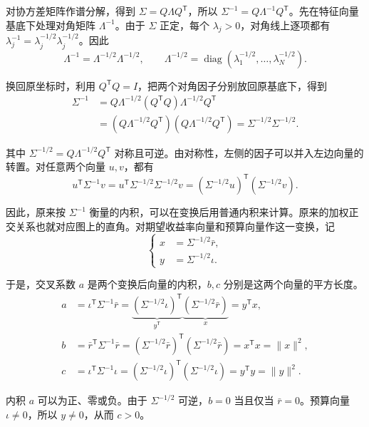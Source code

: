 \begin{solution}[label-content={证明},blank-type=none]
对协方差矩阵作谱分解，得到 $\Sigma=Q\Lambda Q^{\mathsf T}$，所以 $\Sigma^{-1}=Q\Lambda^{-1}Q^{\mathsf T}$。先在特征向量基底下处理对角矩阵 $\Lambda^{-1}$。由于 $\Sigma$ 正定，每个 $\lambda_j>0$，对角线上逐项都有 $\lambda_j^{-1}=\lambda_j^{-1/2}\lambda_j^{-1/2}$。因此
\[
 \Lambda^{-1}=\Lambda^{-1/2}\Lambda^{-1/2},
 \qquad \Lambda^{-1/2}=\operatorname{diag}(\lambda_1^{-1/2},\ldots,\lambda_N^{-1/2}).
\]

换回原坐标时，利用 $Q^{\mathsf T}Q=I$，把两个对角因子分别放回原基底下，得到
\[
 \begin{aligned}
 \Sigma^{-1}
 &=Q\Lambda^{-1/2}(Q^{\mathsf T}Q)\Lambda^{-1/2}Q^{\mathsf T}\\
 &=(Q\Lambda^{-1/2}Q^{\mathsf T})(Q\Lambda^{-1/2}Q^{\mathsf T})
 =\Sigma^{-1/2}\Sigma^{-1/2}.
 \end{aligned}
\]

其中 $\Sigma^{-1/2}=Q\Lambda^{-1/2}Q^{\mathsf T}$ 对称且可逆。由对称性，左侧的因子可以并入左边向量的转置。对任意两个向量 $u,v$，都有
\[
 u^{\mathsf T}\Sigma^{-1}v
 =u^{\mathsf T}\Sigma^{-1/2}\Sigma^{-1/2}v
 =(\Sigma^{-1/2}u)^{\mathsf T}(\Sigma^{-1/2}v).
\]

因此，原来按 $\Sigma^{-1}$ 衡量的内积，可以在变换后用普通内积来计算。原来的加权正交关系也就对应图上的直角。对期望收益率向量和预算向量作这一变换，记
\[
 \left\{
 \begin{aligned}
 x&=\Sigma^{-1/2}\bar r,\\
 y&=\Sigma^{-1/2}\iota.
 \end{aligned}
 \right.
\]

于是，交叉系数 $a$ 是两个变换后向量的内积，$b,c$ 分别是这两个向量的平方长度。
\[
 \begin{aligned}
 a&=\iota^{\mathsf T}\Sigma^{-1}\bar r
   =\underbrace{(\Sigma^{-1/2}\iota)^{\mathsf T}}_{y^{\mathsf T}}
    \underbrace{(\Sigma^{-1/2}\bar r)}_{x}
   =y^{\mathsf T}x,\\
 b&=\bar r^{\mathsf T}\Sigma^{-1}\bar r
   =(\Sigma^{-1/2}\bar r)^{\mathsf T}(\Sigma^{-1/2}\bar r)
   =x^{\mathsf T}x=\lVert x\rVert^2,\\
 c&=\iota^{\mathsf T}\Sigma^{-1}\iota
   =(\Sigma^{-1/2}\iota)^{\mathsf T}(\Sigma^{-1/2}\iota)
   =y^{\mathsf T}y=\lVert y\rVert^2.
 \end{aligned}
\]

内积 $a$ 可以为正、零或负。由于 $\Sigma^{-1/2}$ 可逆，$b=0$ 当且仅当 $\bar r=0$。预算向量 $\iota\ne0$，所以 $y\ne0$，从而 $c>0$。


\end{solution}
